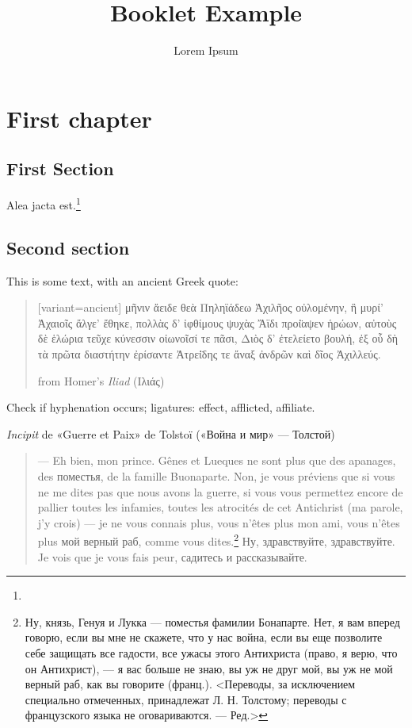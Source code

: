 \documentclass[a4paper,10pt,twoside,titlepage]{book}
\title{Booklet Example}
\author{Lorem Ipsum}
\begin{document}
\setpdftargetpages

\maketitle
\chapter{First chapter}
\section{First Section}

\lipsum[1]

\lipsum[3-5] Alea jacta est.\footnote{\lipsum[6]}

\section{Second section}
\lipsum[7]

This is some text, with an ancient Greek quote: 
\begin{quotation}
\begin{greek}[variant=ancient]
μῆνιν ἄειδε θεὰ Πηληϊάδεω Ἀχιλῆος οὐλομένην, ἣ μυρί' Ἀχαιοῖς ἄλγε'
ἔθηκε, πολλὰς δ' ἰφθίμους ψυχὰς Ἄϊδι προί̈αψεν ἡρώων, αὐτοὺς δὲ ἑλώρια
τεῦχε κύνεσσιν οἰωνοῖσί τε πᾶσι, Διὸς δ' ἐτελείετο βουλή, ἐξ οὗ δὴ τὰ
πρῶτα διαστήτην ἐρίσαντε Ἀτρεί̈δης τε ἄναξ ἀνδρῶν καὶ δῖος Ἀχιλλεύς.
\end{greek}
\begin{flushright}
from Homer's \textit{Iliad}  (\textgreek{Ιλιάς})
\end{flushright}
\end{quotation}

Check if hyphenation occurs; ligatures: effect, afflicted, affiliate.

\medskip

\textit{Incipit} de \textfrench{«Guerre et Paix»} de Tolstoï («Война и мир» — Толстой)
\begin{quotation}
\begin{french}
— Eh bien, mon prince. Gênes et Lueques ne sont plus que des apanages, des поместья, de la famille Buonaparte. Non, je vous préviens que si vous ne me dites pas que nous avons la guerre, si vous vous permettez encore de pallier toutes les infamies, toutes les atrocités de cet Antichrist (ma parole, j’y crois) — je ne vous connais plus, vous n’êtes plus mon ami, vous n’êtes plus \textrussian{мой верный раб, comme vous dites.\footnote{Ну, князь, Генуя и Лукка — поместья фамилии Бонапарте. Нет, я вам вперед говорю, если вы мне не скажете, что у нас война, если вы еще позволите себе защищать все гадости, все ужасы этого Антихриста (право, я верю, что он Антихрист), — я вас больше не знаю, вы уж не друг мой, вы уж не мой верный раб, как вы говорите (франц.). <Переводы, за исключением специально отмеченных, принадлежат Л. Н. Толстому; переводы с французского языка не оговариваются. — Ред.>} Ну, здравствуйте, здравствуйте.} Je vois que je vous fais peur, садитесь и рассказывайте.
\end{french}
\end{quotation}

\lipsum[8-15]

\clearpage \pagestyle{empty} \hbox{} %
\end{document}

